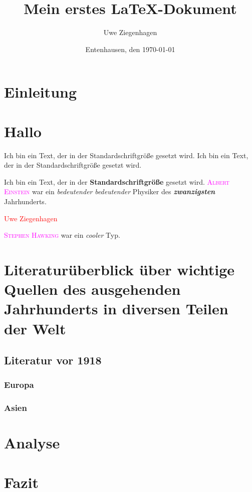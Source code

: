 \documentclass[12pt,ngerman, parskip=half]{scrartcl}
\author{Uwe Ziegenhagen}
\title{Mein erstes LaTeX-Dokument}
\date{Entenhausen, den \today}
\newcommand{\person}[1]{\textcolor{magenta}{\textsc{#1}}}
\begin{document}
\maketitle

\tableofcontents

\section{Einleitung}

\section*{Hallo} %

\blindtext

Ich bin ein Text, der in der Standardschriftgröße gesetzt wird. Ich bin ein Text, der in der Standardschriftgröße gesetzt wird.

Ich bin ein Text, der in der \textbf{Standardschriftgröße} gesetzt wird. \person{Albert Einstein} war ein \textit{bedeutender} \textsl{bedeutender}  Physiker des \textit{\textbf{zwanzigsten}} Jahrhunderts.

\textcolor{red}{Uwe Ziegenhagen}

\person{Stephen Hawking}  war ein \emph{cooler} Typ.

\section[Literatur]{Literaturüberblick über wichtige Quellen des ausgehenden Jahrhunderts in diversen Teilen der Welt}


\subsection{Literatur vor 1918}
\subsubsection{Europa}

\blindtext[2]

\subsubsection{Asien}

\blindtext[2]


\section{Analyse}

\blindtext[2]

\section{Fazit}

\blindtext[2]
\end{document}
